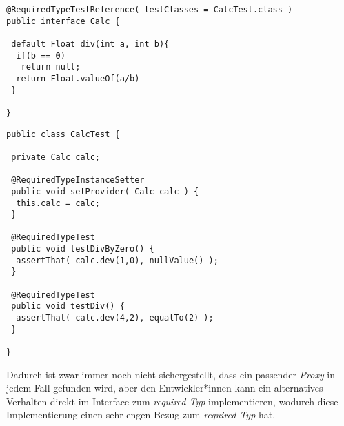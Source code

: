 \begin{lstlisting}[style = java, caption = Interface Calc, captionpos = b, label = lst_interface_calc]
@RequiredTypeTestReference( testClasses = CalcTest.class )
public interface Calc {

 default Float div(int a, int b){
  if(b == 0)
   return null;
  return Float.valueOf(a/b)
 }
 
}
\end{lstlisting}
\begin{lstlisting}[style = java, caption = Test CalcTest, captionpos = b, label = lst_testklasse_calc]
public class CalcTest {

 private Calc calc;
  
 @RequiredTypeInstanceSetter
 public void setProvider( Calc calc ) {
  this.calc = calc;
 }

 @RequiredTypeTest
 public void testDivByZero() {
  assertThat( calc.dev(1,0), nullValue() );
 }
  
 @RequiredTypeTest
 public void testDiv() {
  assertThat( calc.dev(4,2), equalTo(2) );
 }

}
\end{lstlisting}
\noindent
Dadurch ist zwar immer noch nicht sichergestellt, dass ein passender \emph{Proxy} in jedem Fall gefunden wird, aber den Entwickler*innen kann ein alternatives Verhalten direkt im \Gls{Interface} zum \emph{required Typ} implementieren, wodurch diese Implementierung einen sehr engen Bezug zum \emph{required Typ} hat.